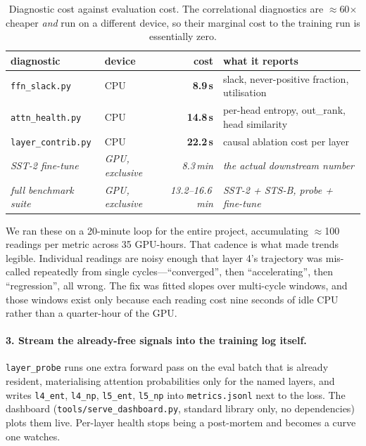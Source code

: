 \documentclass[11pt,a4paper]{article}
\begin{document}
\begin{table}[H]
\centering\footnotesize\setlength{\tabcolsep}{5pt}
\begin{tabular}{llrl}
\toprule
diagnostic & device & cost & what it reports \\
\midrule
\texttt{ffn\_slack.py}     & CPU & \textbf{8.9\,s}  & slack, never-positive fraction, utilisation \\
\texttt{attn\_health.py}   & CPU & \textbf{14.8\,s} & per-head entropy, out\_rank, head similarity \\
\texttt{layer\_contrib.py} & CPU & \textbf{22.2\,s} & causal ablation cost per layer \\
\emph{SST-2 fine-tune}     & \emph{GPU, exclusive} & \emph{8.3\,min} & \emph{the actual downstream number} \\
\emph{full benchmark suite}& \emph{GPU, exclusive} & \emph{13.2--16.6\,min} & \emph{SST-2 + STS-B, probe + fine-tune} \\
\bottomrule
\end{tabular}
\caption{Diagnostic cost against evaluation cost. The correlational diagnostics are
$\approx$60$\times$ cheaper \emph{and} run on a different device, so their marginal cost to the
training run is essentially zero.}
\end{table}

We ran these on a 20-minute loop for the entire project, accumulating $\approx$100 readings per
metric across 35 GPU-hours. That cadence is what made trends legible. Individual readings are
noisy enough that layer 4's trajectory was mis-called repeatedly from single
cycles---``converged'', then ``accelerating'', then ``regression'', all wrong. The fix was
fitted slopes over multi-cycle windows, and those windows exist only because each reading cost
nine seconds of idle CPU rather than a quarter-hour of the GPU.

\paragraph{3. Stream the already-free signals into the training log itself.}
\texttt{layer\_probe} runs one extra forward pass on the eval batch that is already resident,
materialising attention probabilities only for the named layers, and writes
\texttt{l4\_ent}, \texttt{l4\_np}, \texttt{l5\_ent}, \texttt{l5\_np} into
\texttt{metrics.jsonl} next to the loss. The dashboard (\texttt{tools/serve\_dashboard.py},
standard library only, no dependencies) plots them live. Per-layer health stops being a
post-mortem and becomes a curve one watches.
\end{document}
